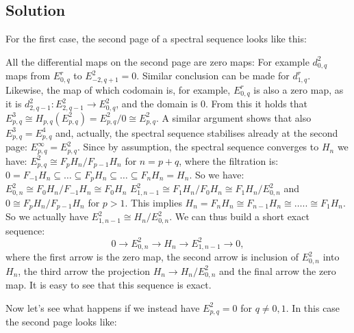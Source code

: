 \documentclass{article}
\begin{document}
\subsection*{Solution}
For the first case, the second page of a spectral sequence looks like this:


All the differential maps on the second page are zero maps: For example $d_{0,q}^2$ maps from $E_{0,q}^r$ to $E_{-2,q+1}^2 = 0$. Similar conclusion can be made for $d_{1,q}^r$. Likewise, the map of which codomain is, for example, $E_{0,q}^r$ is also a zero map, as it is $d_{2,q-1}^2 : E_{2,q-1}^2 \to E_{0,q}^2$, and the domain is $0$. From this it holds that $E^3_{p,q} \cong H_{p,q}(E^2_{p,q}) = E^2_{p,q}/0 \cong E^2_{p,q}$. A similar argument shows that also $E^3_{p,q} = E^4_{p,q}$ and, actually, the spectral sequence stabilises already at the second page: $E^\infty_{p,q} = E^2_{p,q}$.
Since by assumption, the spectral sequence converges to $H_n$ we have:
$E^2_{p,q} \cong F_p H_n / F_{p-1} H_n$ for $n=p+q$,
where the filtration is:
$0 = F_{-1} H_n \subseteq \dots \subseteq F_p H_n \subseteq \dots \subseteq F_n H_n = H_n$.
So we have: $E^2_{0,n} \cong F_0 H_n / F_{-1} H_n \cong F_0 H_n$
$E^2_{1,n-1} \cong F_1 H_n / F_0 H_n \cong F_1 H_n / E^2_{0,n}$ and $0 \cong F_p H_n / F_{p-1} H_n$ for $p>1$.
This implies $H_n = F_n H_n \cong F_{n-1} H_n \cong \dots .. \cong F_1 H_n$.
So we actually have $E^2_{1,n-1} \cong H_n / E_{0,n}^2$. We can thus build a short exact sequence:
\begin{equation*}
0 \to E_{0,n}^2 \to H_n \to E_{1,n-1}^2 \to 0,
\end{equation*}
where the first arrow is the zero map, the second arrow is inclusion of $E_{0,n}^2$ into $H_n$, the third arrow the projection $H_n \to H_n/E_{0,n}^2$ and the final arrow the zero map. It is easy to see that this sequence is exact.

Now let's see what happens if we instead have $E^2_{p,q} = 0$ for $q \neq 0,1$. In this case the second page looks like:
\end{document}
